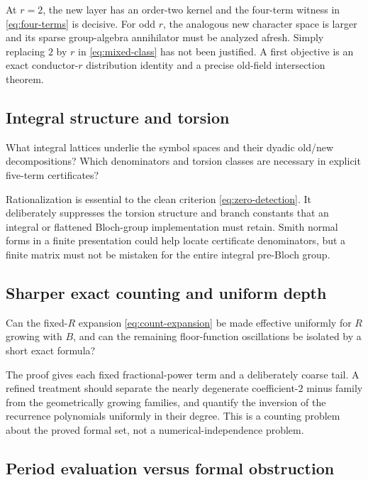 At $r=2$, the new layer has an order-two kernel and the four-term witness
in \eqref{eq:four-terms} is decisive. For odd $r$, the analogous new
character space is larger and its sparse group-algebra annihilator must
be analyzed afresh. Simply replacing $2$ by $r$ in
\eqref{eq:mixed-class} has not been justified. A first objective is an
exact conductor-$r$ distribution identity and a precise old-field
intersection theorem.

\subsection{Integral structure and torsion}

\begin{question}\label{question:integral}
What integral lattices underlie the symbol spaces and their dyadic
old/new decompositions? Which denominators and torsion classes are
necessary in explicit five-term certificates?
\end{question}

Rationalization is essential to the clean criterion
\eqref{eq:zero-detection}. It deliberately suppresses the torsion
structure and branch constants that an integral or flattened Bloch-group
implementation must retain. Smith normal forms in a finite
presentation could help locate certificate denominators, but a finite
matrix must not be mistaken for the entire integral pre-Bloch group.

\subsection{Sharper exact counting and uniform depth}

\begin{question}\label{question:counting}
Can the fixed-$R$ expansion \eqref{eq:count-expansion} be made effective
uniformly for $R$ growing with $B$, and can the remaining floor-function
oscillations be isolated by a short exact formula?
\end{question}

The proof gives each fixed fractional-power term and a deliberately
coarse tail. A refined treatment should separate the nearly degenerate
coefficient-$2$ minus family from the geometrically growing families,
and quantify the inversion of the recurrence polynomials uniformly in
their degree. This is a counting problem about the proved formal set,
not a numerical-independence problem.

\subsection{Period evaluation versus formal obstruction}

